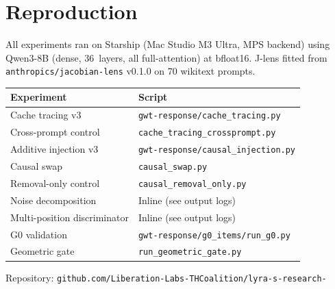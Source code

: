 \documentclass[11pt,a4paper]{article}
\begin{document}
\section{Reproduction}
\label{app:reproduction}

All experiments ran on Starship (Mac Studio M3 Ultra, MPS backend) using
Qwen3-8B (dense, 36~layers, all full-attention) at bfloat16. J-lens
fitted from \texttt{anthropics/jacobian-lens} v0.1.0 on 70 wikitext
prompts.

\begin{table}[ht]
\centering
\small
\begin{tabular}{ll}
\toprule
\textbf{Experiment} & \textbf{Script} \\
\midrule
Cache tracing v3 & \texttt{gwt-response/cache\_tracing.py} \\
Cross-prompt control & \texttt{cache\_tracing\_crossprompt.py} \\
Additive injection v3 & \texttt{gwt-response/causal\_injection.py} \\
Causal swap & \texttt{causal\_swap.py} \\
Removal-only control & \texttt{causal\_removal\_only.py} \\
Noise decomposition & Inline (see output logs) \\
Multi-position discriminator & Inline (see output logs) \\
G0 validation & \texttt{gwt-response/g0\_items/run\_g0.py} \\
Geometric gate & \texttt{run\_geometric\_gate.py} \\
\bottomrule
\end{tabular}
\end{table}

\noindent Repository:
\texttt{github.com/Liberation-Labs-THCoalition/lyra-s-research-}



\end{document}
